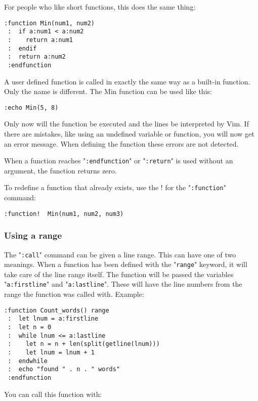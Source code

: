 For people who like short functions, this does the same thing:

\begin{Verbatim}[samepage=true]
 :function Min(num1, num2)
 :  if a:num1 < a:num2
 :    return a:num1
 :  endif
 :  return a:num2
 :endfunction
\end{Verbatim}

A user defined function is called in exactly the same way as a built-in function.
Only the name is different.
The Min function can be used like this:

\begin{Verbatim}[samepage=true]
 :echo Min(5, 8)
\end{Verbatim}

Only now will the function be executed and the lines be interpreted by Vim.
If there are mistakes, like using an undefined variable or function, you will now get an error message.
When defining the function these errors are not detected.

When a function reaches "\verb!:endfunction!" or "\verb!:return!" is used without an argument, the function returns zero.

To redefine a function that already exists, use the ! for the "\verb!:function!" command:

\begin{Verbatim}[samepage=true]
 :function!  Min(num1, num2, num3)
\end{Verbatim}

\subsubsection{Using a range}
The "\verb!:call!" command can be given a line range.
This can have one of two meanings.
When a function has been defined with the "\verb!range!" keyword, it will take care of the line range itself.
The function will be passed the variables "\verb!a:firstline!" and "\verb!a:lastline!".
These will have the line numbers from the range the function was called with.
Example:

\begin{Verbatim}[samepage=true]
 :function Count_words() range
 :  let lnum = a:firstline
 :  let n = 0
 :  while lnum <= a:lastline
 :    let n = n + len(split(getline(lnum)))
 :    let lnum = lnum + 1
 :  endwhile
 :  echo "found " . n . " words"
 :endfunction
\end{Verbatim}

You can call this function with:


